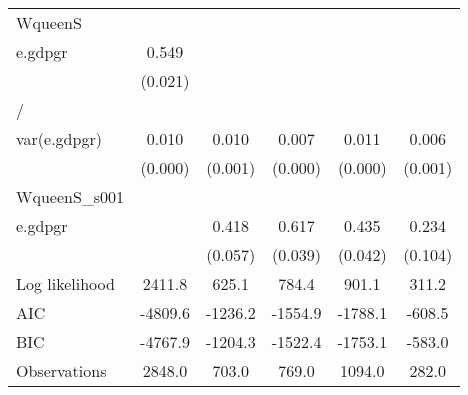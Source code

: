 \begin{table}[htbp]
\begin{tabular}{l*{5}{c}}
\hline
WqueenS             &                     &                     &                     &                     &                     \\
e.gdpgr             &       0.549\sym{***}&                     &                     &                     &                     \\
                    &     (0.021)         &                     &                     &                     &                     \\
\hline
/                   &                     &                     &                     &                     &                     \\
var(e.gdpgr)        &       0.010\sym{***}&       0.010\sym{***}&       0.007\sym{***}&       0.011\sym{***}&       0.006\sym{***}\\
                    &     (0.000)         &     (0.001)         &     (0.000)         &     (0.000)         &     (0.001)         \\
\hline
WqueenS\_s001        &                     &                     &                     &                     &                     \\
e.gdpgr             &                     &       0.418\sym{***}&       0.617\sym{***}&       0.435\sym{***}&       0.234\sym{**} \\
                    &                     &     (0.057)         &     (0.039)         &     (0.042)         &     (0.104)         \\
\hline
Log likelihood      &      2411.8         &       625.1         &       784.4         &       901.1         &       311.2         \\
AIC                 &     -4809.6         &     -1236.2         &     -1554.9         &     -1788.1         &      -608.5         \\
BIC                 &     -4767.9         &     -1204.3         &     -1522.4         &     -1753.1         &      -583.0         \\
Observations        &      2848.0         &       703.0         &       769.0         &      1094.0         &       282.0         \\
\hline\hline
\end{tabular}
\end{table}
